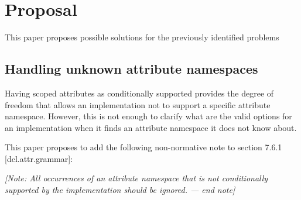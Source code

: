\section{Proposal}

This paper proposes possible solutions for the previously identified problems

\subsection{Handling unknown attribute namespaces}

Having scoped attributes as conditionally supported provides the degree of
freedom that allows an implementation not to support a specific attribute namespace.
However, this is not enough to clarify what are the valid options for an
implementation when it finds an attribute namespace it does not know about.

This paper proposes to add the following non-normative note to section 7.6.1 [dcl.attr.grammar]:

\vspace{1em}
\emph{[Note: All occurrences of an attribute namespace that is not conditionally supported
by the implementation should be ignored. --- end note]}

